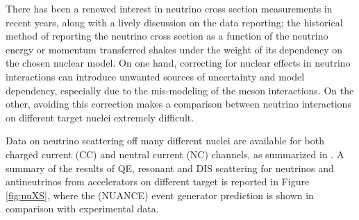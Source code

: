 There has been a renewed interest in neutrino cross section measurements in recent years, along with a lively discussion on the data reporting; the historical method of reporting the neutrino cross section as a function of the neutrino energy or momentum transferred shakes under the weight of its dependency on the chosen nuclear model.   On one hand, correcting for nuclear effects in neutrino interactions can introduce unwanted sources of uncertainty and model dependency, especially due to the mis-modeling of the meson interactions. On the other, avoiding this correction makes a comparison between neutrino interactions on different target nuclei extremely difficult.

Data on neutrino scattering off many different nuclei are available for both charged current (CC) and neutral current (NC) channels, as summarized in \cite{RevModPhys.84.1307}. A summary of the results of QE, resonant and DIS scattering for neutrinos and antineutrinos from accelerators on different target is reported in Figure \ref{fig:nuXS}, where the (NUANCE) \cite{Casper2002} event generator prediction is shown in comparison with experimental data.

